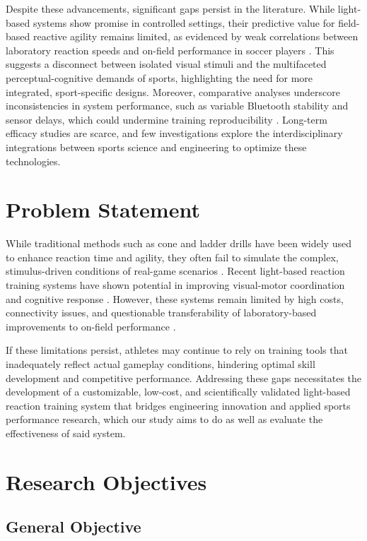 Despite these advancements, significant gaps persist in the literature. While light-based systems show promise in controlled settings, their predictive value for field-based reactive agility remains limited, as evidenced by weak correlations between laboratory reaction speeds and on-field performance in soccer players \cite{Broodryk:2025:LBR}. This suggests a disconnect between isolated visual stimuli and the multifaceted perceptual-cognitive demands of sports, highlighting the need for more integrated, sport-specific designs. Moreover, comparative analyses underscore inconsistencies in system performance, such as variable Bluetooth stability and sensor delays, which could undermine training reproducibility \cite{Ezhov:2021:MLS}. Long-term efficacy studies are scarce, and few investigations explore the interdisciplinary integrations between sports science and engineering to optimize these technologies.


\section{Problem Statement}
While traditional methods such as cone and ladder drills have been widely used to enhance reaction time and agility, they often fail to simulate the complex, stimulus-driven conditions of real-game scenarios \cite{Hassan:2023:ESF}. Recent light-based reaction training systems have shown potential in improving visual-motor coordination and cognitive response \cite{Horvath:2022:ARA, Jothi:2025:EVT}. However, these systems remain limited by high costs, connectivity issues, and questionable transferability of laboratory-based improvements to on-field performance \cite{Broodryk:2025:LBR, Ezhov:2021:MLS}.

If these limitations persist, athletes may continue to rely on training tools that inadequately reflect actual gameplay conditions, hindering optimal skill development and competitive performance. Addressing these gaps necessitates the development of a customizable, low-cost, and scientifically validated light-based reaction training system that bridges engineering innovation and applied sports performance research, which our study aims to do as well as evaluate the effectiveness of said system.


\section{Research Objectives}
\label{sec:researchobjectives}

\subsection{General Objective}
\label{sec:generalobjective}

